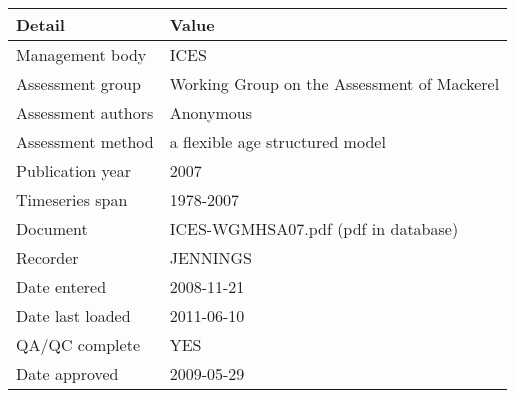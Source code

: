 \begin{table}[htb]
\centering
\begin{tabular}{lp{7cm}}
\toprule
Detail & Value \\
\midrule
Management body    & ICES                                        \\
Assessment group   & Working Group on the Assessment of Mackerel \\
Assessment authors & Anonymous                                   \\
Assessment method  & a flexible age structured model             \\
Publication year   & 2007                                        \\
Timeseries span    & 1978-2007                                   \\
Document           & ICES-WGMHSA07.pdf (pdf in database)         \\
Recorder           & JENNINGS                                    \\
Date entered       & 2008-11-21                                  \\
Date last loaded   & 2011-06-10                                  \\
QA/QC complete     & YES                                         \\
Date approved      & 2009-05-29                                  \\
\bottomrule
\end{tabular}
\label{tab:assessdet}
\end{table}
